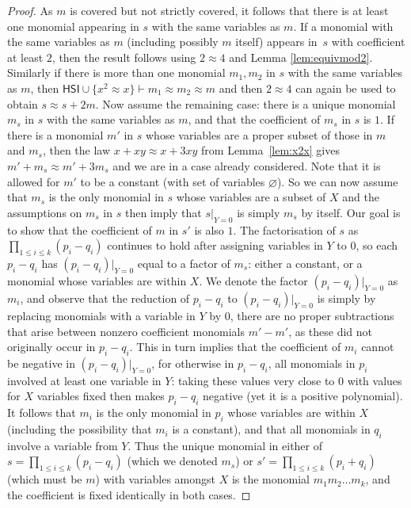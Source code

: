 \documentclass[eqnor,reqno]{amsart}
\theoremstyle{plain}
\theoremstyle{definition}
\newcommand{\HSI}{\textsf{HSI}}
\begin{document}
\begin{proof}
As $m$ is covered but not strictly covered, it follows that there is at least one monomial appearing in $s$ with the same variables as $m$.  
If a monomial with the same variables as $m$ (including possibly $m$ itself) appears in~$s$ with coefficient at least $2$, then the result follows using $2\approx 4$ and Lemma \ref{lem:equivmod2}.  
Similarly if there is more than one monomial $m_1,m_2$ in $s$ with the same variables as $m$, then $\HSI\cup\{x^2\approx x\}\vdash m_1\approx m_2\approx m$ and then $2\approx 4$ can again be used to obtain $s\approx s+2m$.   
Now assume the remaining case: there is a unique monomial $m_s$ in $s$ with the same variables as $m$, and that the coefficient of $m_s$ in $s$ is $1$.   
If there is a monomial $m'$ in $s$ whose variables are a proper subset of those in $m$ and $m_s$, then the law $x+xy\approx x+3xy$ from Lemma~\ref{lem:x2x} gives $m'+m_s\approx m'+3m_s$ and we are in a case already considered.  Note that it is allowed for $m'$ to be a constant (with set of variables $\varnothing$).  
So we can now assume that $m_s$ is the only monomial in $s$ whose variables are a subset of $X$ and the assumptions on $m_s$ in $s$ then imply that $s|_{Y=0}$ is simply $m_s$ by itself.  Our goal is to show that the coefficient of $m$ in $s'$ is also $1$.    
The factorisation of $s$ as $\prod_{1\leq i\leq k}(p_i-q_i)$ continues to hold after assigning variables in $Y$ to $0$, so each $p_i-q_i$ has $(p_i-q_i)|_{Y=0}$ equal to a factor of $m_s$: either a constant, or a monomial whose variables are within $X$.  
We denote the factor $(p_i-q_i)|_{Y=0}$ as $m_i$, and observe that the reduction of $p_i-q_i$ to $(p_i-q_i)|_{Y=0}$ is simply by replacing monomials with a variable in $Y$ by $0$, there are no proper subtractions that arise between nonzero coefficient monomials $m'-m'$, as these did not originally occur in $p_i-q_i$.
This in turn implies that the coefficient of $m_i$ cannot be negative in $(p_i-q_i)|_{Y=0}$, for otherwise in $p_i-q_i$, all monomials in $p_i$ involved at least one variable in $Y$: taking these values very close to $0$ with values for $X$ variables fixed then makes $p_i-q_i$ negative (yet it is a positive polynomial).
It follows that $m_i$ is the only monomial in $p_i$ whose variables are within $X$ (including the possibility that $m_i$ is a constant), and that all monomials in $q_i$ involve a variable from $Y$. 
Thus the unique monomial in either of $s=\prod_{1\leq i\leq k}(p_i-q_i)$ (which we denoted $m_s$) or $s'=\prod_{1\leq i\leq k}(p_i+q_i)$ (which must be $m$) with variables amongst $X$ is the monomial $m_1m_2\dots m_k$, and the coefficient is fixed identically in both cases.
\end{proof}
\end{document}
